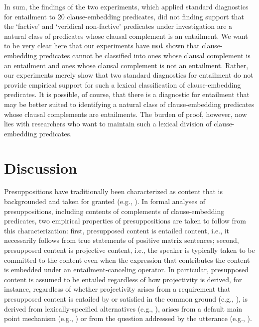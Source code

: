 \documentclass[11pt,fleqn]{article}
\newcommand{\6}{\mbox{$[\hspace*{-.6mm}[$}}
\newcommand{\9}{\mbox{$]\hspace*{-.6mm}]$}}
\begin{document}
{In sum, the findings of the two experiments, which applied standard diagnostics for entailment to 20 clause-embedding predicates, did not finding support that the `factive' and `veridical non-factive' predicates under investigation are a natural class of predicates whose clausal complement is an entailment. We want to be very clear here that our experiments have {\bf not} shown that clause-embedding predicates cannot be classified into ones whose clausal complement is an entailment and ones whose clausal complement is not an entailment. Rather, our experiments merely show that two standard diagnostics for entailment do not provide empirical support for such a lexical classification of clause-embedding predicates. It is possible, of course, that there is a diagnostic for entailment that may be better suited to identifying a natural class of clause-embedding predicates whose clausal complements are entailments. The burden of proof, however, now lies with researchers who want to maintain such a lexical division of clause-embedding predicates. 

\section{Discussion}\label{s4}

Presuppositions have traditionally been characterized as content that is backgrounded and taken for granted (e.g., \citealt{stalnaker74,ccmg90}). In formal analyses of presuppositions, including contents of complements of clause-embedding predicates, two empirical properties of presuppositions are taken to follow from this characterization: first, presupposed content is entailed content, i.e., it necessarily follows from true statements of positive matrix sentences; second, presupposed content is projective content, i.e., the speaker is typically taken to be committed to the content even when the expression that contributes the content is embedded under an entailment-canceling operator. In particular, presupposed content is assumed to be entailed regardless of how projectivity is derived, for instance, regardless of whether projectivity arises from a requirement that presupposed content is entailed by or satisfied in the common ground (e.g., \citealt{heim83,vds92}),  is derived  from lexically-specified alternatives (e.g., \citealt{abusch10,romoli2015}), arises from a default main point mechanism (e.g., \citealt{abrusan2011,abrusan2016}) or from the question addressed by the utterance (e.g., \citealt{best-question}). 

}
\end{document}
